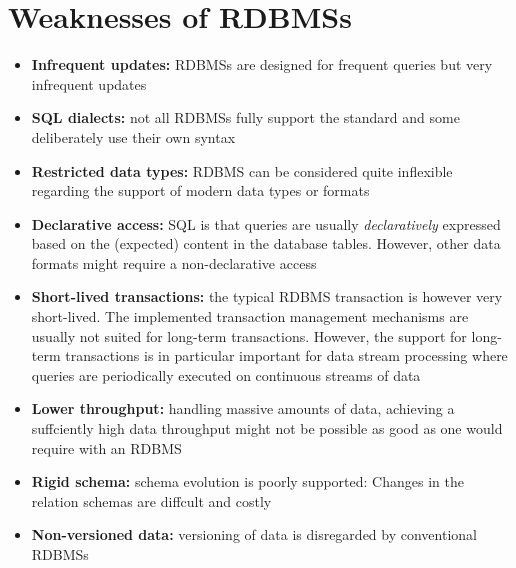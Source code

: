 \section{Weaknesses of RDBMSs}
\begin{itemize}
    \item \textbf{Infrequent updates:} RDBMSs are designed for frequent queries but very infrequent updates 
    \item \textbf{SQL dialects:} not all RDBMSs fully support the standard and some deliberately use their own syntax
    \item \textbf{Restricted data types:} RDBMS can be considered quite inflexible regarding the support of modern data types or formats
    \item \textbf{Declarative access:} SQL is that queries are usually \textit{declaratively} expressed based on the (expected) content in the database tables. However, other data formats might require a non-declarative access
    \item \textbf{Short-lived transactions:} the typical RDBMS transaction is however very short-lived. The implemented transaction management mechanisms are usually not suited for long-term transactions. However, the support for long-term transactions is in particular important for data stream processing where queries are periodically executed on continuous streams of data
    \item \textbf{Lower throughput:} handling massive amounts of data, achieving a suffciently high data throughput might not be possible as good as one would require with an RDBMS
    \item \textbf{Rigid schema:} schema evolution is poorly supported: Changes in the relation schemas are diffcult and costly
    \item \textbf{Non-versioned data:} versioning of data is disregarded by conventional RDBMSs
\end{itemize}


